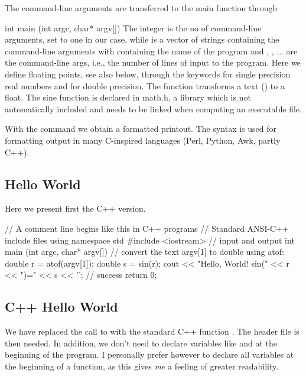 \documentclass[%
twoside,                 %
final,                   %
10pt]{article}
\newenvironment{block_mdfboxadmon}[1][]{
\begin{block_mdfboxmdframed}[frametitle=#1]
}
{
\end{block_mdfboxmdframed}
}
\begin{document}
\begin{block_mdfboxadmon}[Dissection II.]
The command-line arguments are transferred to the main function through

\bcppcod
   int main (int argc, char* argv[])
\ecppcod
The integer  is the no of command-line arguments, set to
one in our case, while
 is a vector of strings containing the command-line arguments
with  containing  the name of the program
and , , ... are the command-line args, i.e., the number of
lines of input to the program.
Here we define floating points, see also below,
through the keywords  for single precision real numbers and
 for double precision. The function
 transforms a text () to a float.
The sine function is declared in math.h, a library which
is not automatically included and needs to be linked when computing
an executable file.

With the command  we obtain a formatted printout.
The  syntax is used for formatting output
in many C-inspired languages (Perl, Python, Awk, partly C++).
\end{block_mdfboxadmon}



\subsection{Hello World}


\begin{block_mdfboxadmon}[Now in C++.]
Here we present first the C++ version.

\bcpppro
// A comment line begins like this in C++ programs
// Standard ANSI-C++ include files
using namespace std
#include <iostream>  // input and output
int main (int argc, char* argv[])
{
  // convert the text argv[1] to double using atof:
  double r = atof(argv[1]);
  double s = sin(r);
  cout << "Hello, World! sin(" << r << ")=" << s << '\n';
  // success
  return 0;
}
\ecpppro
\end{block_mdfboxadmon}



\subsection{C++ Hello World}


\begin{block_mdfboxadmon}[Dissection I.]
We have replaced the call to  with the standard C++ function
. The header file  is then needed.
In addition, we don't need to
declare variables like  and   at the beginning of the program.
I personally prefer
however to declare all variables at the beginning of a function, as this
gives \emph{me} a feeling of greater readability.
\end{block_mdfboxadmon}
\end{document}
